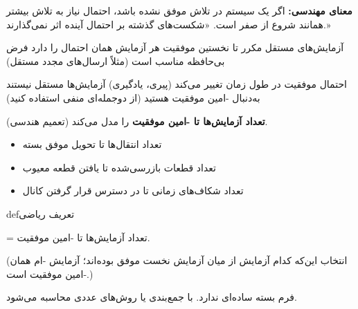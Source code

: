 
\textbf{معنای مهندسی:} اگر یک سیستم در  تلاش موفق نشده باشد، احتمال نیاز به  تلاش بیشتر همانند شروع از صفر است. «شکست‌های گذشته بر احتمال آینده اثر نمی‌گذارند.»


\lr{\mbox{\PSyes{}}} آزمایش‌های مستقل مکرر تا نخستین موفقیت\PSbr{}\lr{\mbox{\PSyes{}}} هر آزمایش همان احتمال را دارد\PSbr{}\lr{\mbox{\PSyes{}}} فرض بی‌حافظه مناسب است (مثلاً ارسال‌های مجدد مستقل)


\lr{\mbox{\PSno{}}} احتمال موفقیت در طول زمان تغییر می‌کند (پیری، یادگیری)\PSbr{}\lr{\mbox{\PSno{}}} آزمایش‌ها مستقل نیستند\PSbr{}\lr{\mbox{\PSno{}}} به‌دنبال -امین موفقیت هستید (از دوجمله‌ای منفی استفاده کنید)



\textbf{تعداد آزمایش‌ها تا -امین موفقیت} را مدل می‌کند (تعمیم هندسی).


\begin{itemize}
\tightlist
\item
  تعداد انتقال‌ها تا تحویل موفق  بسته
\item
  تعداد قطعات بازرسی‌شده تا یافتن  قطعه معیوب
\item
  تعداد شکاف‌های زمانی تا در دسترس قرار گرفتن  کانال
\end{itemize}

\begin{PSbox}[unbreakable]{def}{تعریف ریاضی}

 = تعداد آزمایش‌ها تا -امین موفقیت.

\end{PSbox}



(انتخاب این‌که کدام  آزمایش از میان  آزمایش نخست موفق بوده‌اند؛ آزمایش -ام همان -امین موفقیت است.)


فرم بسته ساده‌ای ندارد. با جمع‌بندی یا روش‌های عددی محاسبه می‌شود.

